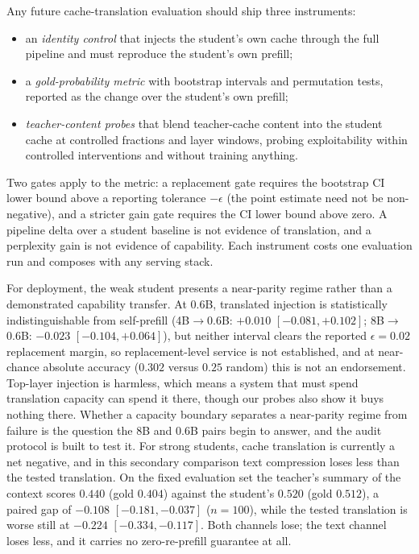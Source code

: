 \documentclass[10pt]{article}
\begin{document}
Any future cache-translation evaluation should ship three instruments:
\begin{itemize}
\item an \emph{identity control} that injects the student's own cache through
the full pipeline and must reproduce the student's own prefill;
\item a \emph{gold-probability metric} with bootstrap intervals and
permutation tests, reported as the change over the student's own prefill;
\item \emph{teacher-content probes} that blend teacher-cache content into the student
cache at controlled fractions and layer windows, probing exploitability within
controlled interventions and without training anything.
\end{itemize}
Two gates apply to the metric: a replacement gate requires the bootstrap CI
lower bound above a reporting tolerance $-\epsilon$ (the point estimate
need not be non-negative), and a stricter
gain gate requires the CI lower bound above zero. A pipeline delta over a
student baseline is not evidence of translation, and a perplexity gain is not
evidence of capability. Each instrument costs one evaluation run and composes
with any serving stack.

For deployment, the weak student presents a near-parity regime rather than a
demonstrated capability transfer. At 0.6B, translated injection is
statistically indistinguishable from self-prefill
(4B$\to$0.6B: $+0.010$ $[-0.081,+0.102]$; 8B$\to$0.6B: $-0.023$
$[-0.104,+0.064]$), but neither interval clears the reported $\epsilon{=}0.02$ replacement margin, so replacement-level service is not established, and
at near-chance absolute accuracy ($0.302$ versus $0.25$ random) this is not an
endorsement. Top-layer injection is harmless, which means a system that
must spend translation capacity can spend it there, though our probes also
show it buys nothing there. Whether a capacity boundary separates a
near-parity regime from failure is the question the 8B
and 0.6B pairs begin to answer, and the audit protocol is built to test it.
For strong students, cache translation is currently a net negative, and in this
secondary comparison text compression loses less than the tested translation.
On the fixed evaluation set the teacher's summary of the context scores $0.440$
(gold $0.404$) against the student's $0.520$ (gold $0.512$), a paired gap of
$-0.108$ $[-0.181, -0.037]$ ($n{=}100$), while the tested translation is worse
still at $-0.224$ $[-0.334, -0.117]$. Both channels lose; the text channel loses
less, and it carries no zero-re-prefill guarantee at all.
\end{document}
